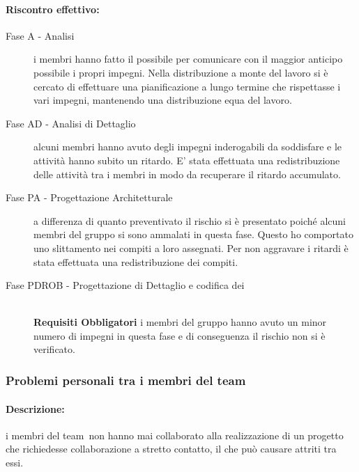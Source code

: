 \documentclass[../PianoProgetto.tex]{subfiles}
\begin{document}
	\paragraph*{Riscontro effettivo:}
		\begin{description}
			\item[Fase A - Analisi] i membri hanno fatto il possibile per comunicare con il maggior anticipo possibile i propri impegni. Nella distribuzione a monte del lavoro si è cercato di effettuare una pianificazione a lungo termine che rispettasse i vari impegni, mantenendo una distribuzione equa del lavoro.
			\item[Fase AD - Analisi di Dettaglio] alcuni membri hanno avuto degli impegni inderogabili da soddisfare e le attività hanno subito un ritardo. E' stata effettuata una redistribuzione delle attività tra i membri in modo da recuperare il ritardo accumulato. 
			\item[Fase PA - Progettazione Architetturale] a differenza  di quanto preventivato il rischio si è presentato poiché alcuni membri del gruppo si sono ammalati in questa fase. Questo ho comportato uno slittamento nei compiti a loro assegnati. Per non aggravare i ritardi è stata effettuata una redistribuzione dei compiti.
			\item[Fase PDROB - Progettazione di Dettaglio e codifica dei]  \ \\
					\textbf{Requisiti Obbligatori} i membri del gruppo hanno avuto un minor numero di impegni in questa fase e di conseguenza il rischio non si è verificato.
		\end{description}
	
\newpage
\subsubsection{Problemi personali tra i membri del team}
\label{sec:Problemi personali tra i membri del team}

	\paragraph*{Descrizione:} i membri del team\g\ non hanno mai collaborato alla realizzazione di un progetto che richiedesse collaborazione a stretto contatto, il che può causare attriti tra essi.
	
\end{document}
